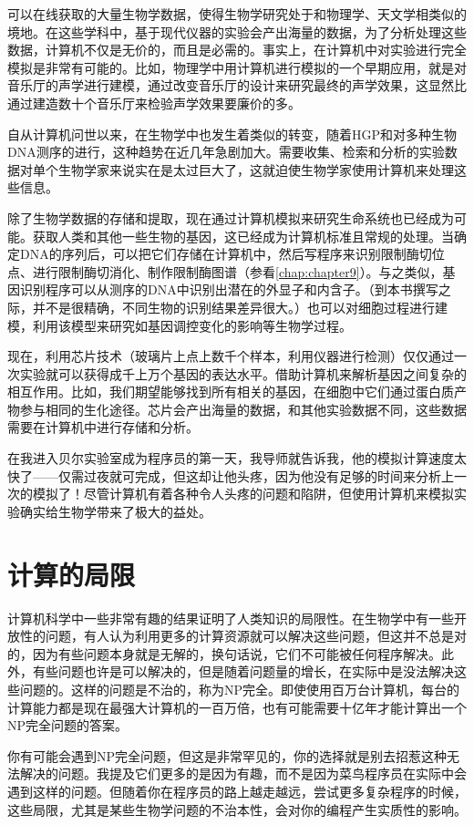 可以在线获取的大量生物学数据，使得生物学研究处于和物理学、天文学相类似的境地。在这些学科中，基于现代仪器的实验会产出海量的数据，为了分析处理这些数据，计算机不仅是无价的，而且是必需的。事实上，在计算机中对实验进行完全模拟是非常有可能的。比如，物理学中用计算机进行模拟的一个早期应用，就是对音乐厅的声学进行建模，通过改变音乐厅的设计来研究最终的声学效果，这显然比通过建造数十个音乐厅来检验声学效果要廉价的多。

自从计算机问世以来，在生物学中也发生着类似的转变，随着HGP和对多种生物DNA测序的进行，这种趋势在近几年急剧加大。需要收集、检索和分析的实验数据对单个生物学家来说实在是太过巨大了，这就迫使生物学家使用计算机来处理这些信息。

除了生物学数据的存储和提取，现在通过计算机模拟来研究生命系统也已经成为可能。获取人类和其他一些生物的基因，这已经成为计算机标准且常规的处理。当确定DNA的序列后，可以把它们存储在计算机中，然后写程序来识别限制酶切位点、进行限制酶切消化、制作限制酶图谱（参看\autoref{chap:chapter9}）。与之类似，基因识别程序可以从测序的DNA中识别出潜在的外显子和内含子。（到本书撰写之际，并不是很精确，不同生物的识别结果差异很大。）也可以对细胞过程进行建模，利用该模型来研究如基因调控变化的影响等生物学过程。

现在，利用芯片技术（玻璃片上点上数千个样本，利用仪器进行检测）仅仅通过一次实验就可以获得成千上万个基因的表达水平。借助计算机来解析基因之间复杂的相互作用。比如，我们期望能够找到所有相关的基因，在细胞中它们通过蛋白质产物参与相同的生化途径。芯片会产出海量的数据，和其他实验数据不同，这些数据需要在计算机中进行存储和分析。

在我进入贝尔实验室成为程序员的第一天，我导师就告诉我，他的模拟计算速度太快了——仅需过夜就可完成，但这却让他头疼，因为他没有足够的时间来分析上一次的模拟了！尽管计算机有着各种令人头疼的问题和陷阱，但使用计算机来模拟实验确实给生物学带来了极大的益处。

\section{计算的局限}
计算机科学中一些非常有趣的结果证明了人类知识的局限性。在生物学中有一些开放性的问题，有人认为利用更多的计算资源就可以解决这些问题，但这并不总是对的，因为有些问题本身就是无解的，换句话说，它们不可能被任何程序解决。此外，有些问题也许是可以解决的，但是随着问题量的增长，在实际中是没法解决这些问题的。这样的问题是不治的，称为NP完全。即使使用百万台计算机，每台的计算能力都是现在最强大计算机的一百万倍，也有可能需要十亿年才能计算出一个NP完全问题的答案。

你有可能会遇到NP完全问题，但这是非常罕见的，你的选择就是别去招惹这种无法解决的问题。我提及它们更多的是因为有趣，而不是因为菜鸟程序员在实际中会遇到这样的问题。但随着你在程序员的路上越走越远，尝试更多复杂程序的时候，这些局限，尤其是某些生物学问题的不治本性，会对你的编程产生实质性的影响。
